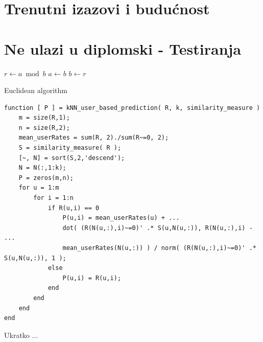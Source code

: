 \documentclass[a4paper,oneside,12pt]{memoir} %
\begin{document}
\chapter{Trenutni izazovi i budućnost}
\label{ch: trenutni izazovi i buducnost}


\chapter{Ne ulazi u diplomski - Testiranja}	
\begin{algorithm}[H]
 {
$r \leftarrow a \bmod b$\;
$a \leftarrow b$\;
$b \leftarrow r$\;
}
\caption{Euclidean algorithm}
\end{algorithm}

\begin{lstlisting}[caption=Test]
function [ P ] = kNN_user_based_prediction( R, k, similarity_measure ) 
    m = size(R,1);
    n = size(R,2);
    mean_userRates = sum(R, 2)./sum(R~=0, 2);
    S = similarity_measure( R );
    [~, N] = sort(S,2,'descend');
    N = N(:,1:k);
    P = zeros(m,n);
    for u = 1:m
        for i = 1:n
            if R(u,i) == 0
                P(u,i) = mean_userRates(u) + ...
                dot( (R(N(u,:),i)~=0)' .* S(u,N(u,:)), R(N(u,:),i) - ...
                mean_userRates(N(u,:)) ) / norm( (R(N(u,:),i)~=0)' .* S(u,N(u,:)), 1 );
            else
                P(u,i) = R(u,i);
            end
        end
    end
end
\end{lstlisting}




\begingroup
\raggedright

\nocite{*}
\endgroup

\pagestyle{empty} %


\begin{sazetak}
Ukratko ...
\end{sazetak}
\end{document}
